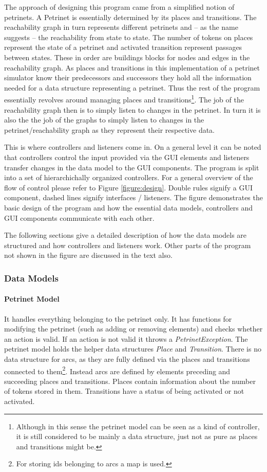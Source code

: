 \documentclass[10pt, a4paper]{article}
\begin{document}
The approach of designing this program came from a simplified notion of petrinets. A Petrinet is essentially determined by its places and transitions. The reachability graph in turn represents different petrinets and -- as the name suggests -- the reachability from state to state. The number of tokens on places represent the state of a petrinet and activated transition represent passages between states. These in order are buildings blocks for nodes and edges in the reachability graph. As places and transitions in this implementation of a petrinet simulator know their predecessors and successors they hold all the information needed for a data structure representing a petrinet. Thus the rest of the program essentially revolves around managing places and transitions\footnote{Although in this sense the petrinet model can be seen as a kind of controller, it is still considered to be mainly a data structure, just not as pure as places and transitions might be.}. The job of the reachability graph then is to simply listen to changes in the petrinet. In turn it is also the the job of the graphs to simply listen to changes in the petrinet/reachability graph as they represent their respective data. 

This is where controllers and listeners come in. On a general level it can be noted that controllers control the input provided via the GUI elements and listeners transfer changes in the data model to the GUI components. The program is split into a set of hierarchichally organized controllers. For a general overview of the flow of control please refer to Figure \ref{figure:design}. Double rules signify a GUI component, dashed lines signify interfaces / listeners. The figure demonstrates the basic design of the program and how the essential data models, controllers and GUI components communicate with each other. 

The following sections give a detailed description of how the data models are structured and how controllers and listeners work. Other parts of the program not shown in the figure are discussed in the text also.



\subsubsection{Data Models}

\paragraph{Petrinet Model} It handles everything belonging to the petrinet only. It has functions for modifying the petrinet (such as adding or removing elements) and checks whether an action is valid. If an action is not valid it throws a \textit{PetrinetException}. The petrinet model holds the helper data structures \textit{Place} and \textit{Transition}. There is no data structure for arcs, as they are fully defined via the places and transitions connected to them\footnote{For storing ids belonging to arcs a map is used.}. Instead arcs are defined by elements preceding and succeeding places and transitions. Places contain information about the number of tokens stored in them. Transitions have a status of being activated or not activated.   
\end{document}
